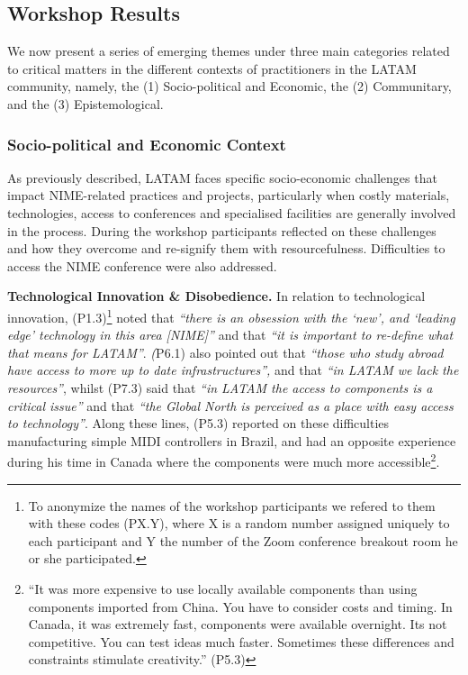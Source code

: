 \documentclass[sigconf]{nimeart}
\begin{document}
\subsection{Workshop Results}\label{workshop-results}

We now present a series of emerging themes under three main categories related to critical matters in the different contexts of practitioners in the LATAM community, namely, the (1) Socio-political and Economic, the (2) Communitary, and the (3) Epistemological.

\subsubsection{Socio-political and Economic Context}\label{socio-political-and-economic-context}

As previously described, LATAM faces specific socio-economic challenges that impact NIME-related practices and projects, particularly when costly materials, technologies, access to conferences and specialised facilities are generally involved in the process. During the workshop participants reflected on these challenges and how they overcome and re-signify them with resourcefulness. Difficulties to access the NIME conference were also addressed.

\textbf{Technological Innovation \& Disobedience.} In relation to technological innovation, (P1.3)\footnote{To anonymize the names of the workshop participants we refered to them with these codes (PX.Y), where X is a random number assigned uniquely to each participant and Y the number of the Zoom conference breakout room he or she participated.} noted that \emph{``there is an obsession with the `new', and `leading edge' technology in this area {[}NIME{]}''} and that \emph{``it is important to re-define what that means for LATAM''}. \emph{(}P6.1) also pointed out that \emph{``those who study abroad have access to more up to date infrastructures'',} and that \emph{``in LATAM we lack the resources''}, whilst (P7.3) said that \emph{``in LATAM the access to components is a critical issue''} and that \emph{``the Global North is perceived as a place with easy access to technology''}. Along these lines, (P5.3) reported on these difficulties manufacturing simple MIDI controllers in Brazil, and had an opposite experience during his time in Canada where the components were much more accessible\footnote{``It was more expensive to use locally available components than using components imported from China. You have to consider costs and timing. In Canada, it was extremely fast, components were available overnight. It\textquotesingle s not competitive. You can test ideas much faster. Sometimes these differences and constraints stimulate creativity.'' (P5.3)}.
\end{document}
